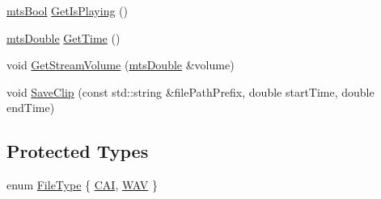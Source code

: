 \begin{DoxyCompactItemize}
\hyperlink{mts_generic_object_proxy_8h_ae2e26261f1874d4aa4ee374ece7646bd}{mts\+Bool} \hyperlink{classosa_open_a_l_a83801e2797eb2ca44d22f7a20a4b88fe}{Get\+Is\+Playing} ()
\item 
\hyperlink{mts_generic_object_proxy_8h_a31e76b0190a8d3f9838626cd7b47bd75}{mts\+Double} \hyperlink{classosa_open_a_l_a0c5ab11c0646b2a83e09c13d2864f2b1}{Get\+Time} ()
\item 
void \hyperlink{classosa_open_a_l_a3df1f6f29e0825f6a32fd7da064945b1}{Get\+Stream\+Volume} (\hyperlink{mts_generic_object_proxy_8h_a31e76b0190a8d3f9838626cd7b47bd75}{mts\+Double} \&volume)
\item 
void \hyperlink{classosa_open_a_l_a2a030267d360056f17373fc1f6a074e9}{Save\+Clip} (const std\+::string \&file\+Path\+Prefix, double start\+Time, double end\+Time)
\end{DoxyCompactItemize}
\subsection*{Protected Types}
\begin{DoxyCompactItemize}
\item 
enum \hyperlink{classosa_open_a_l_a909b566bfee85658c0108a38937545aa}{File\+Type} \{ \hyperlink{classosa_open_a_l_a909b566bfee85658c0108a38937545aaa3087f4cea2491d4626699ede1d7a1fa5}{C\+A\+I}, 
\hyperlink{classosa_open_a_l_a909b566bfee85658c0108a38937545aaa01e3105cb505f689685114c4dd4ab37c}{W\+A\+V}
 \}
\end{DoxyCompactItemize}
